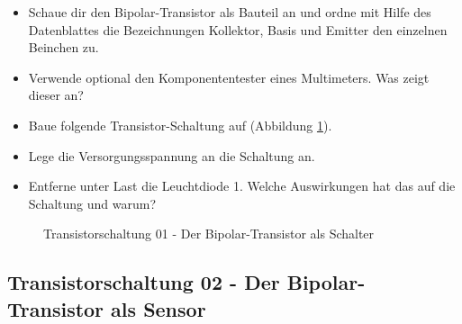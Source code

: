 \begin{itemize}
\itemsep1pt\parskip0pt
\item Schaue dir den Bipolar-Transistor als Bauteil an und ordne mit Hilfe des Datenblattes die Bezeichnungen Kollektor, Basis und Emitter den einzelnen Beinchen zu.
\item Verwende optional den Komponententester eines Multimeters. Was zeigt dieser an?
\item Baue folgende Transistor-Schaltung auf (Abbildung \ref{s01}). 
\item Lege die Versorgungsspannung an die Schaltung an.
\item Entferne unter Last die Leuchtdiode 1. Welche Auswirkungen hat das auf die Schaltung und warum?
\end{itemize}

\begin{figure}[H]
	\centering
	\caption{Transistorschaltung 01 - Der Bipolar-Transistor als Schalter}
	\label{s01}
\end{figure}


\subsection*{Transistorschaltung 02 - Der Bipolar-Transistor als Sensor}

